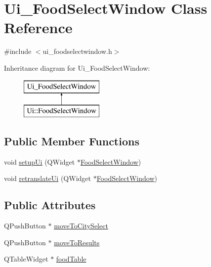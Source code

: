 \hypertarget{class_ui___food_select_window}{}\section{Ui\+\_\+\+Food\+Select\+Window Class Reference}
\label{class_ui___food_select_window}


{\ttfamily \#include $<$ui\+\_\+foodselectwindow.\+h$>$}

Inheritance diagram for Ui\+\_\+\+Food\+Select\+Window\+:\begin{figure}[H]
\begin{center}
\leavevmode
\includegraphics[height=2.000000cm]{class_ui___food_select_window}
\end{center}
\end{figure}
\subsection*{Public Member Functions}
\begin{DoxyCompactItemize}
\item 
void \mbox{\hyperlink{class_ui___food_select_window_ae81797d9f7f0d379818c83b9867e0333}{setup\+Ui}} (Q\+Widget $\ast$\mbox{\hyperlink{class_food_select_window}{Food\+Select\+Window}})
\item 
void \mbox{\hyperlink{class_ui___food_select_window_aa0b4201d4db08190cb97fa76fbf3f39c}{retranslate\+Ui}} (Q\+Widget $\ast$\mbox{\hyperlink{class_food_select_window}{Food\+Select\+Window}})
\end{DoxyCompactItemize}
\subsection*{Public Attributes}
\begin{DoxyCompactItemize}
\item 
Q\+Push\+Button $\ast$ \mbox{\hyperlink{class_ui___food_select_window_a6d7e3e7bf1bc994438582bf3a7462952}{move\+To\+City\+Select}}
\item 
Q\+Push\+Button $\ast$ \mbox{\hyperlink{class_ui___food_select_window_aabf2f0f4d6761c9507f88e0033e87f95}{move\+To\+Results}}
\item 
Q\+Table\+Widget $\ast$ \mbox{\hyperlink{class_ui___food_select_window_abddd1172ee154f7cb0635e1797d6c5f7}{food\+Table}}
\end{DoxyCompactItemize}


